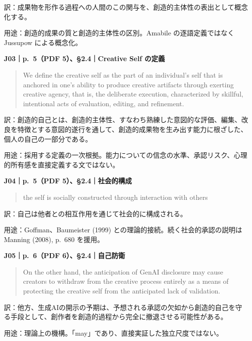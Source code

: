 \documentclass[
  11pt,
  a4paper,
]{article}
\begin{document}
訳：成果物を形作る過程への人間のこの関与を、創造的主体性の表出として概念化する。

用途：創造的成果の質と創造的主体性の区別。Amabile の逐語定義ではなく
Jussupow による概念化。


\textbf{J03｜p.~5（PDF 5）、§2.4｜Creative Self の定義}

\begin{quote}
We define the creative self as the part of an individual's self that is
anchored in one's ability to produce creative artifacts through exerting
creative agency, that is, the deliberate execution, characterized by
skillful, intentional acts of evaluation, editing, and refinement.
\end{quote}

訳：創造的自己とは、創造的主体性、すなわち熟練した意図的な評価、編集、改良を特徴とする意図的遂行を通して、創造的成果物を生み出す能力に根ざした、個人の自己の一部分である。

用途：採用する定義の一次根拠。能力についての信念の水準、承認リスク、心理的所有感を直接定義する文ではない。


\textbf{J04｜p.~5（PDF 5）、§2.4｜社会的構成}

\begin{quote}
the self is socially constructed through interaction with others
\end{quote}

訳：自己は他者との相互作用を通じて社会的に構成される。

用途：Goffman、Baumeister (1999) との理論的接続。続く社会的承認の説明は
Manning (2008), p.~680 を援用。


\textbf{J05｜p.~6（PDF 6）、§2.4｜自己防衛}

\begin{quote}
On the other hand, the anticipation of GenAI disclosure may cause
creators to withdraw from the creative process entirely as a means of
protecting the creative self from the anticipated lack of validation.
\end{quote}

訳：他方、生成AIの開示の予期は、予想される承認の欠如から創造的自己を守る手段として、創作者を創造的過程から完全に撤退させる可能性がある。

用途：理論上の機構。「may」であり、直接実証した独立尺度ではない。
\end{document}
